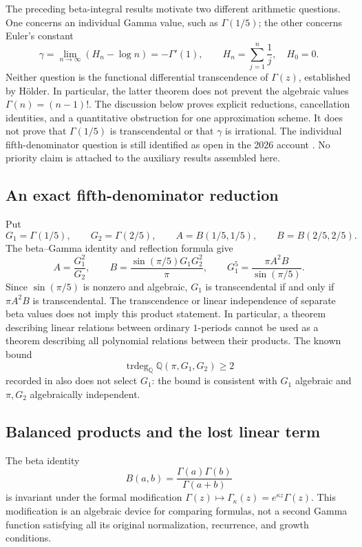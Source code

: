 \documentclass[11pt,a4paper]{article}
\theoremstyle{definition}
\theoremstyle{remark}
\numberwithin{equation}{section}
\begin{document}
The preceding beta-integral results motivate two different arithmetic
questions. One concerns an individual Gamma value, such as $\Gamma(1/5)$;
the other concerns Euler's constant
\[
 \gamma=\lim_{n\to\infty}(H_n-\log n)=-\Gamma'(1),
 \qquad H_n=\sum_{j=1}^n\frac1j,\quad H_0=0.
\]
Neither question is the functional differential transcendence of
$\Gamma(z)$, established by H\"older. In particular, the latter theorem
does not prevent the algebraic values $\Gamma(n)=(n-1)!$.
The discussion below proves explicit reductions, cancellation identities,
and a quantitative obstruction for one approximation scheme. It does not
prove that $\Gamma(1/5)$ is transcendental or that $\gamma$ is irrational.
The individual fifth-denominator question is still identified as open in
the 2026 account \cite{gamma-Sheth}. No priority claim is attached to the
auxiliary results assembled here.

\subsection{An exact fifth-denominator reduction}
\label{gamma-fifth}

Put
\[
 G_1=\Gamma(1/5),\qquad G_2=\Gamma(2/5),\qquad
 A=B(1/5,1/5),\qquad B=B(2/5,2/5).
\]
The beta--Gamma identity and reflection formula give
\begin{equation} A=\frac{G_1^2}{G_2},\qquad
 B=\frac{\sin(\pi/5)G_1G_2^2}{\pi},\qquad
 \boxed{G_1^5=\frac{\pi A^2B}{\sin(\pi/5)}}.
 \label{gamma-fifth-formula}
\end{equation}
Since $\sin(\pi/5)$ is nonzero and algebraic, $G_1$ is transcendental
if and only if $\pi A^2B$ is transcendental. The transcendence or linear
independence of separate beta values does not imply this product statement.
In particular, a theorem describing linear relations between ordinary
$1$-periods cannot be used as a theorem describing all polynomial
relations between their products. The known bound
\[
 \operatorname{trdeg}_{\mathbb Q}\mathbb Q(\pi,G_1,G_2)\ge2
\]
recorded in \cite{gamma-Rivoal} also does not select $G_1$: the bound is
consistent with $G_1$ algebraic and $\pi,G_2$ algebraically independent.

\subsection{Balanced products and the lost linear term}
\label{gamma-balanced}

The beta identity
\[
 B(a,b)=\frac{\Gamma(a)\Gamma(b)}{\Gamma(a+b)}
\]
is invariant under the formal modification
$\Gamma(z)\mapsto\Gamma_\kappa(z)=e^{\kappa z}\Gamma(z)$.
This modification is an algebraic device for comparing formulas, not a
second Gamma function satisfying all its original normalization,
recurrence, and growth conditions.
\end{document}
